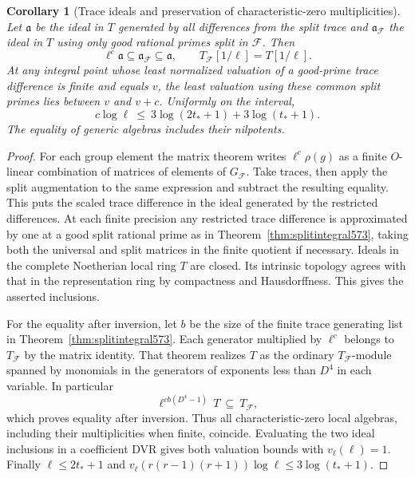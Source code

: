 \documentclass[a4paper,11pt]{article}
\newtheorem{corollary}[proposition]{Corollary}
\theoremstyle{definition}
\theoremstyle{remark}
\numberwithin{equation}{section}
\begin{document}
\begin{corollary}[Trace ideals and preservation of characteristic-zero multiplicities]
\leavevmode\label{cor:splitloss574}
Let \(\mathfrak a\) be the ideal in \(T\) generated by all
differences from the split trace and \(\mathfrak a_{\mathcal F}\)
the ideal in \(T\) using only good rational primes split in
\(\mathcal F\). Then
\[
     \ell^c\mathfrak a\subseteq\mathfrak a_{\mathcal F}
           \subseteq\mathfrak a,\qquad
     T_{\mathcal F}[1/\ell]=T[1/\ell].
\]
At any integral point whose least normalized valuation of a
good-prime trace difference is finite and equals \(v\), the
least valuation using these common split primes lies between
\(v\) and \(v+c\). Uniformly on the interval,
\[
          c\log\ell\ \le\
             3\log(2t_*+1)+3\log(t_*+1).
\]
The equality of generic algebras includes their nilpotents.
\end{corollary}
\begin{proof}
For each group element the matrix theorem writes
\(\ell^c\rho(g)\) as a finite \(O\)-linear combination of
matrices of elements of \(G_{\mathcal F}\). Take traces,
then apply the split augmentation to the same expression
and subtract the resulting equality. This puts the scaled
trace difference in the ideal generated by the restricted
differences. At each finite precision any restricted trace
difference is approximated by one at a good split rational
prime as in Theorem~\ref{thm:splitintegral573}, taking
both the universal and split matrices in the finite
quotient if necessary. Ideals in the complete Noetherian
local ring \(T\) are closed. Its intrinsic topology agrees
with that in the representation ring by compactness and
Hausdorffness. This gives the asserted inclusions.

For the equality after inversion, let \(b\) be the size of
the finite trace generating list in
Theorem~\ref{thm:splitintegral573}. Each generator multiplied
by \(\ell^c\) belongs to \(T_{\mathcal F}\) by the matrix
identity. That theorem realizes \(T\) as the ordinary
\(T_{\mathcal F}\)-module spanned by monomials in the
generators of exponents less than \(D^4\) in each variable.
In particular
\[
                \ell^{c b(D^4-1)}\,T\ \subseteq\ T_{\mathcal F},
\]
which proves equality after inversion. Thus all
characteristic-zero local algebras, including their
multiplicities when finite, coincide. Evaluating the two
ideal inclusions in a coefficient DVR gives both valuation
bounds with \(v_\ell(\ell)=1\). Finally
\(\ell\le2t_*+1\) and
\(v_\ell(r(r-1)(r+1))\log\ell\le3\log(t_*+1)\).
\end{proof}
\end{document}
